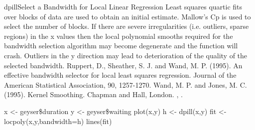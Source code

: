 \begin{Helpfile}{dpill}{Select a Bandwidth for Local Linear Regression}
Least squares quartic fits over blocks of data are used to 
obtain an initial estimate. Mallow's Cp is used to select
the number of blocks.
If there are severe irregularities (i.e. outliers, sparse regions)
in the x values then the local polynomial smooths required for the
bandwidth selection algorithm may become degenerate and the function
will crash. Outliers in the y direction may lead to deterioration
of the quality of the selected bandwidth.
Ruppert, D., Sheather, S. J. and Wand, M. P. (1995).
An effective bandwidth selector for local least squares
regression.
Journal of the American Statistical Association,
90, 1257-1270.
Wand, M. P. and Jones, M. C. (1995).
Kernel Smoothing.
Chapman and Hall, London.
, .
\need 15pt
\vspace{-16pt}
\begin{Example}
x <- geyser\$duration
y <- geyser\$waiting
plot(x,y)
h <- dpill(x,y)
fit <- locpoly(x,y,bandwidth=h)
lines(fit)
\end{Example}
\end{Helpfile}
